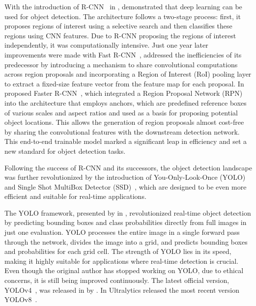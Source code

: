 With the introduction of R-CNN~\cite{Girshick14} in \citeyear{Girshick14}, \citeauthor{Girshick14} demonstrated that deep learning can be used for object detection. The architecture follows a two-stage process: first, it proposes regions of interest using a selective search and then classifies these regions using CNN features. Due to R-CNN proposing the regions of interest independently, it was computationally intensive. Just one year later improvements were made with Fast R-CNN~\cite{Girshick15}, addressed the inefficiencies of its predecessor by introducing a mechanism to share convolutional computations across region proposals and incorporating a Region of Interest (RoI) pooling layer to extract a fixed-size feature vector from the feature map for each proposal. In \citeyear{Ren17} \citeauthor{Ren17} proposed Faster R-CNN~\cite{Ren17}, which integrated a Region Proposal Network (RPN) into the architecture that employs anchors, which are predefined reference boxes of various scales and aspect ratios and used as a basis for proposing potential object locations. This allows the generation of region proposals almost cost-free by sharing the convolutional features with the downstream detection network. This end-to-end trainable model marked a significant leap in efficiency and set a new standard for object detection tasks.

Following the success of R-CNN and its successors, the object detection landscape was further revolutionized by the introduction of You-Only-Look-Once (YOLO)~\cite{Redmon15} and Single Shot MultiBox Detector (SSD)~\cite{Liu15}, which are designed to be even more efficient and suitable for real-time applications.

The YOLO framework, presented by \citeauthor{Redmon15} in \citeyear{Redmon15}, revolutionized real-time object detection by predicting bounding boxes and class probabilities directly from full images in just one evaluation. YOLO processes the entire image in a single forward pass through the network, divides the image into a grid, and predicts bounding boxes and probabilities for each grid cell. The strength of YOLO lies in its speed, making it highly suitable for applications where real-time detection is crucial. Even though the original author has stopped working on YOLO, due to ethical concerns, it is still being improved continuously. The latest official version, YOLOv4~\cite{Bochkovskiy20}, was released in \citeyear{Bochkovskiy20} by \citeauthor{Bochkovskiy20}. In \citeyear{Jocher23a} Ultralytics released the most recent version YOLOv8~\cite{Jocher23a, Jocher23b}.

